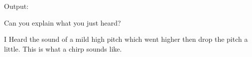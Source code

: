 {\LARGE Output:}

 Can you explain what you just heard?

	I Heard the sound of a mild high pitch which went higher then drop the pitch a little. This is what a chirp sounds like.


\pagebreak
